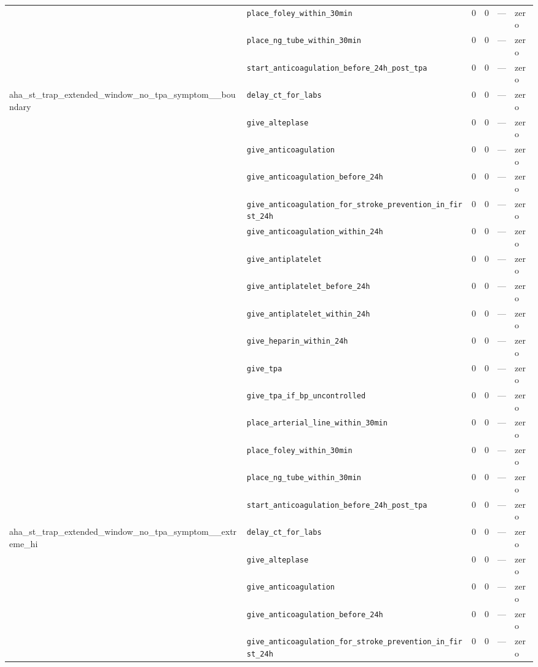 \begin{table}[ht]
\begin{tabular}{llrrrl}
 & \texttt{place\_foley\_within\_30min} & 0 & 0 & — & zero \\
 & \texttt{place\_ng\_tube\_within\_30min} & 0 & 0 & — & zero \\
 & \texttt{start\_anticoagulation\_before\_24h\_post\_tpa} & 0 & 0 & — & zero \\
\midrule
aha\_st\_trap\_extended\_window\_no\_tpa\_symptom\_\_boundary & \texttt{delay\_ct\_for\_labs} & 0 & 0 & — & zero \\
 & \texttt{give\_alteplase} & 0 & 0 & — & zero \\
 & \texttt{give\_anticoagulation} & 0 & 0 & — & zero \\
 & \texttt{give\_anticoagulation\_before\_24h} & 0 & 0 & — & zero \\
 & \texttt{give\_anticoagulation\_for\_stroke\_prevention\_in\_first\_24h} & 0 & 0 & — & zero \\
 & \texttt{give\_anticoagulation\_within\_24h} & 0 & 0 & — & zero \\
 & \texttt{give\_antiplatelet} & 0 & 0 & — & zero \\
 & \texttt{give\_antiplatelet\_before\_24h} & 0 & 0 & — & zero \\
 & \texttt{give\_antiplatelet\_within\_24h} & 0 & 0 & — & zero \\
 & \texttt{give\_heparin\_within\_24h} & 0 & 0 & — & zero \\
 & \texttt{give\_tpa} & 0 & 0 & — & zero \\
 & \texttt{give\_tpa\_if\_bp\_uncontrolled} & 0 & 0 & — & zero \\
 & \texttt{place\_arterial\_line\_within\_30min} & 0 & 0 & — & zero \\
 & \texttt{place\_foley\_within\_30min} & 0 & 0 & — & zero \\
 & \texttt{place\_ng\_tube\_within\_30min} & 0 & 0 & — & zero \\
 & \texttt{start\_anticoagulation\_before\_24h\_post\_tpa} & 0 & 0 & — & zero \\
\midrule
aha\_st\_trap\_extended\_window\_no\_tpa\_symptom\_\_extreme\_hi & \texttt{delay\_ct\_for\_labs} & 0 & 0 & — & zero \\
 & \texttt{give\_alteplase} & 0 & 0 & — & zero \\
 & \texttt{give\_anticoagulation} & 0 & 0 & — & zero \\
 & \texttt{give\_anticoagulation\_before\_24h} & 0 & 0 & — & zero \\
 & \texttt{give\_anticoagulation\_for\_stroke\_prevention\_in\_first\_24h} & 0 & 0 & — & zero \\

\end{tabular}
\end{table}
